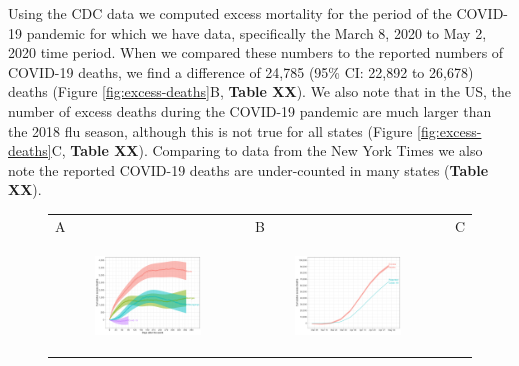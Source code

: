 \documentclass[11pt]{article}
\begin{document}
Using the CDC data we computed excess mortality for the period of the COVID-19 pandemic for which we have data, specifically the March 8, 2020 to May 2, 2020 time period. When we compared these numbers to the reported numbers of COVID-19 deaths, we find a difference of 24,785 (95\% CI: 22,892 to 26,678) deaths (Figure \ref{fig:excess-deaths}B, \textbf{Table XX}). We also note that in the US, the number of excess deaths during the COVID-19 pandemic are much larger than the 2018 flu season, although this is not true for all states (Figure \ref{fig:excess-deaths}C, \textbf{Table XX}). Comparing to data from the New York Times \cite{smith2020coronavirus} we also note the reported COVID-19 deaths are under-counted in many states (\textbf{Table XX}).

\begin{figure}[ht]
	\begin{tabular}{lll}
	A&B&C\\
	\begin{subfigure}[t]{0.3\linewidth}
		\centering
		\includegraphics[width=1\linewidth]{figs/figure-2a.pdf} 
	\end{subfigure}&
	\begin{subfigure}[t]{0.3\linewidth}
		\centering
		\includegraphics[width=1\linewidth]{figs/figure-2b.pdf}

\end{subfigure}
\end{tabular}
\end{figure}
\end{document}
